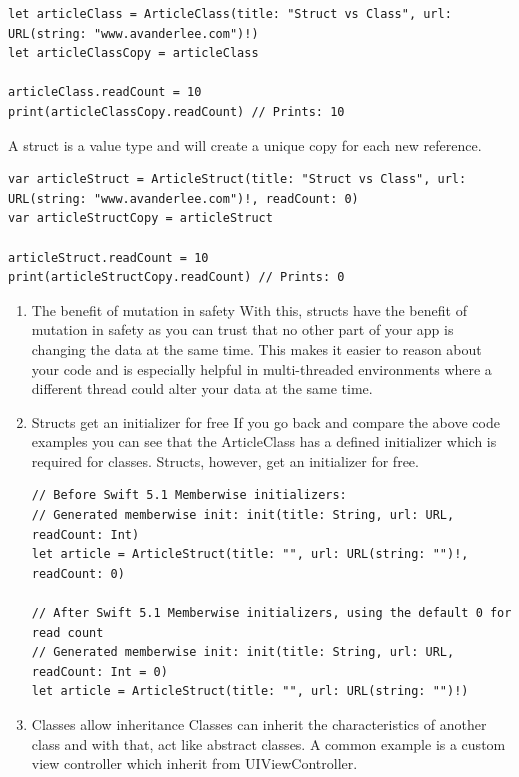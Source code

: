 \documentclass[a4paper,12pt]{article}
\begin{document}
\begin{enumerate}
\lstset{breaklines=true,language=swift,label= ,caption= ,captionpos=b,firstnumber=1,numbers=left}
\begin{lstlisting}
let articleClass = ArticleClass(title: "Struct vs Class", url: URL(string: "www.avanderlee.com")!)
let articleClassCopy = articleClass

articleClass.readCount = 10
print(articleClassCopy.readCount) // Prints: 10
\end{lstlisting}

A struct is a value type and will create a unique copy for each new reference.\\
\lstset{breaklines=true,language=swift,label= ,caption= ,captionpos=b,firstnumber=1,numbers=left}
\begin{lstlisting}
var articleStruct = ArticleStruct(title: "Struct vs Class", url: URL(string: "www.avanderlee.com")!, readCount: 0)
var articleStructCopy = articleStruct

articleStruct.readCount = 10
print(articleStructCopy.readCount) // Prints: 0
\end{lstlisting}
\begin{enumerate}
\item The benefit of mutation in safety
\label{sec:orgbd211f4}
With this, structs have the benefit of mutation in safety as you can trust that no other part of your app is changing the data at the same time. This makes it easier to reason about your code and is especially helpful in multi-threaded environments where a different thread could alter your data at the same time.\\
\item Structs get an initializer for free
\label{sec:org7573e76}
If you go back and compare the above code examples you can see that the ArticleClass has a defined initializer which is required for classes. Structs, however, get an initializer for free.\\
\lstset{breaklines=true,language=swift,label= ,caption= ,captionpos=b,firstnumber=1,numbers=left}
\begin{lstlisting}
// Before Swift 5.1 Memberwise initializers:
// Generated memberwise init: init(title: String, url: URL, readCount: Int)
let article = ArticleStruct(title: "", url: URL(string: "")!, readCount: 0)

// After Swift 5.1 Memberwise initializers, using the default 0 for read count
// Generated memberwise init: init(title: String, url: URL, readCount: Int = 0)
let article = ArticleStruct(title: "", url: URL(string: "")!)
\end{lstlisting}
\item Classes allow inheritance
\label{sec:org7fb7720}
Classes can inherit the characteristics of another class and with that, act like abstract classes. A common example is a custom view controller which inherit from UIViewController.\\


\end{enumerate}
\end{enumerate}
\end{document}
